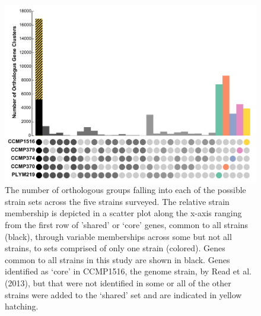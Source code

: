 
\begin{figure}[p!]
  \centering
    \includegraphics[width=1.0\textwidth]{Images/C6_FigureS3_GeneDistrubtion.pdf}
    \caption[The number of orthologous groups falling into each of the possible strain sets across the five strains surveyed]{The number of orthologous groups falling into each of the possible strain sets across the five strains surveyed. The relative strain membership is depicted in a scatter plot along the x-axis ranging from the first row of 'shared' or `core' genes, common to all strains (black), through variable memberships across some but not all strains, to sets comprised of only one strain (colored). Genes common to all strains in this study are shown in black. Genes identified as `core' in CCMP1516, the genome strain, by Read et al. (2013), but that were not identified in some or all of the other strains were added to the `shared' set and are indicated in yellow hatching. }
    \label{fig:a5f3}
\end{figure}



